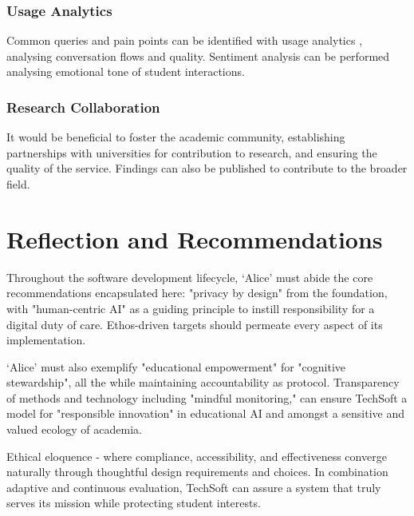 \documentclass[14pt,a4paper]{article}
\begin{document}
\begin{multicols}{2}
\subsubsection{Usage Analytics}
Common queries and pain points can be identified with usage analytics \textit{\parencite[pp. 50-100]{Beasley2023}}, analysing conversation flows and quality.
Sentiment analysis \textit{\parencite[pp. 50-100]{Liu2023}} can be performed analysing emotional tone of student interactions.

\subsubsection*{Research Collaboration}
    It would be beneficial to foster the academic community, establishing partnerships with universities \textit{\parencite[pp. 50-100]{Dillenbourg2023}} for contribution to research, and ensuring the quality of the service. Findings can also be published to contribute to the broader field.

\end{multicols}
\section{Reflection and Recommendations}
Throughout the software development lifecycle, `Alice' must abide the core recommendations encapsulated here: "privacy by design" from the foundation, with "human-centric AI" as a guiding principle to instill responsibility for a digital duty of care. Ethos-driven targets should permeate every aspect of its implementation.

`Alice' must also exemplify "educational empowerment" for "cognitive stewardship", all the while maintaining accountability as protocol. Transparency of methods and technology including "mindful monitoring," can ensure TechSoft a model for "responsible innovation" in educational AI and amongst a sensitive and valued ecology of academia.

Ethical eloquence - where compliance, accessibility, and effectiveness converge naturally through thoughtful design requirements and choices. In combination adaptive and continuous evaluation, TechSoft can assure a system that truly serves its mission while protecting student interests.
\end{document}

